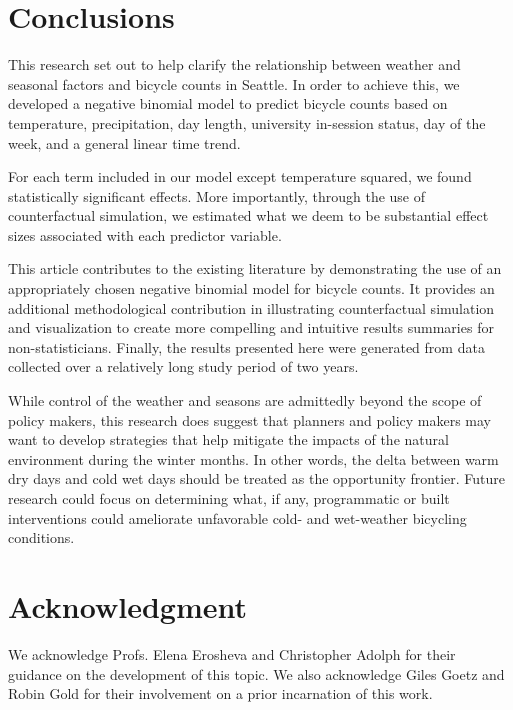 \documentclass[12pt,letterpaper,article]{memoir}
\begin{document}
\chapter*{Conclusions}
This research set out to help clarify the relationship between weather
and seasonal factors and bicycle counts in Seattle. In order to
achieve this, we developed a negative binomial model to predict
bicycle counts based on temperature, precipitation, day length,
university in-session status, day of the week, and a general linear
time trend.

For each term included in our model except temperature squared, we
found statistically significant effects. More importantly, through the
use of counterfactual simulation, we estimated what we deem to be
substantial effect sizes associated with each predictor variable.

This article contributes to the existing literature by demonstrating
the use of an appropriately chosen negative binomial model for bicycle
counts. It provides an additional methodological contribution in
illustrating counterfactual simulation and visualization to create
more compelling and intuitive results summaries for
non-statisticians. Finally, the results presented here were generated
from data collected over a relatively long study period of two years.

While control of the weather and seasons are admittedly beyond the
scope of policy makers, this research does suggest that planners and
policy makers may want to develop strategies that help mitigate the
impacts of the natural environment during the winter months. In other
words, the delta between warm dry days and cold wet days should be
treated as the opportunity frontier. Future research could focus on
determining what, if any, programmatic or built interventions could
ameliorate unfavorable cold- and wet-weather bicycling conditions.

\chapter*{Acknowledgment}
We acknowledge Profs. Elena Erosheva and Christopher Adolph for their
guidance on the development of this topic. We also acknowledge Giles
Goetz and Robin Gold for their involvement on a prior incarnation of
this work.

\printbibliography
\end{document}
